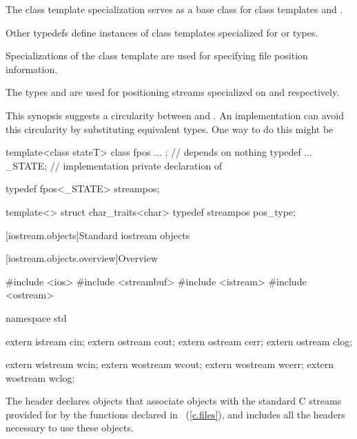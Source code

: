 \pnum
The
class template specialization
serves as a base class for class templates
and
.

\pnum
Other typedefs define instances of
class templates
specialized for
or
types.

\pnum
Specializations of the class template
are
used for specifying file position information.

\pnum
The types
and
are used for positioning streams specialized on
and
respectively.

\pnum
This synopsis suggests a circularity between
and
.
An implementation can avoid this circularity by substituting equivalent
types.
One way to do this might be
\begin{codeblock}
template<class stateT> class fpos { ... };      // depends on nothing
typedef ... _STATE;             // implementation private declaration of 

typedef fpos<_STATE> streampos;

template<> struct char_traits<char> {
  typedef streampos
  pos_type;
}
\end{codeblock}
\exitnote

[iostream.objects]{Standard iostream objects}

[iostream.objects.overview]{Overview}

%

\begin{codeblock}
#include <ios>
#include <streambuf>
#include <istream>
#include <ostream>

namespace std {
  extern istream cin;
  extern ostream cout;
  extern ostream cerr;
  extern ostream clog;

  extern wistream wcin;
  extern wostream wcout;
  extern wostream wcerr;
  extern wostream wclog;
}
\end{codeblock}

\pnum
The header
declares objects that associate objects with the
standard C streams provided for by the functions declared in
~(\ref{c.files}), and includes all the headers necessary to use
these objects.
%

